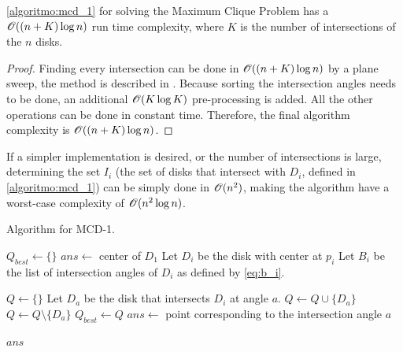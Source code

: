 \begin{teorema}\label{lema:disk}
	\autoref{algoritmo:mcd_1} for solving the Maximum Clique Problem has a $\mathscr{O}((n+K)\log{n})$ run time complexity, where $K$ is the number of intersections of the $n$ disks.
\end{teorema}

\begin{proof}
	Finding every intersection can be done in $\mathscr{O}((n+K)\log{n})$  by a plane sweep, the method is described in . 
	Because sorting the intersection angles needs to be done, an additional $\mathscr{O}(K\log{K})$ pre-processing is added. All the other operations can be done in constant time. Therefore, the final algorithm complexity is $\mathscr{O}((n+K)\log{n})$.
\end{proof}

If a simpler implementation is desired, or the number of intersections is large, determining the set $I_i$ (the set of disks that intersect with $D_i$, defined in \autoref{algoritmo:mcd_1}) can be simply done in $\mathscr{O}(n^2)$, making the algorithm have a worst-case complexity of $\mathscr{O}(n^2\log{n})$.

\begin{algoritmo}[b]
\caption{Algorithm for MCD-1.}\label{algoritmo:mcd_1}
\begin{algorithmic}[1]

\item[]

\State $Q_{best} \gets \{\}$
\State $ans \gets$ center of $D_1$
\State Let $D_i$ be the disk with center at $p_i$
\State Let $B_i$ be the list of intersection angles of $D_i$ as defined by \autoref{eq:b_i}.

\State $Q \gets \{\}$ 
\State Let $D_a$ be the disk that intersects $D_i$ at angle $a$. 
\State $Q \gets Q \cup \{D_a\}$
\Else
\State $Q \gets Q \setminus \{D_a\}$
\EndIf
{} 
\State $Q_{best} \gets Q$
\State $ans \gets $ point corresponding to the intersection angle $a$
\EndIf

\EndFor
\EndFor

\State \Return $ans$
\EndProcedure
\end{algorithmic}
\end{algoritmo}

